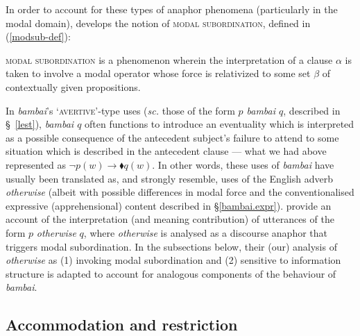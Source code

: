 In order to account for these types of anaphor phenomena (particularly in the modal domain), \citet{Roberts1989,Roberts1990,Roberts2020} develops the notion of \textsc{modal subordination}, defined in (\ref{modsub-def}):

\pex\label{modsub-def}\textsc{modal subordination} is a phenomenon wherein the interpretation of a clause $ \alpha $ is taken to involve a modal operator whose force is relativized to some set $ \beta $ of contextually given propositions.\hfill\citep[718]{Roberts1989}


\xe







In \textit{bambai}'s `\textsc{avertive'}-type uses (\textit{sc.} those of the form \textit{$ p $ bambai $ q $}, described in \S~\ref{lest}), \textit{bambai $ q $} often functions to introduce an eventuality which is interpreted as a possible consequence of the antecedent subject's failure to attend to some situation which is described in the antecedent clause --- what we had above represented as $ \neg p(w)\to\blacklozenge q(w)$. In other words, these uses of \textit{bambai} have usually been translated as, and strongly resemble, uses of the English adverb \textit{otherwise} (albeit with possible differences in modal force and the conventionalised expressive (apprehensional) content described in \S \ref{bambai.expr}). \citet{PhilKotek} provide an account of the interpretation (and meaning contribution) of utterances of the form $ p  $ \textit{otherwise} $ q $, where \textit{otherwise} is analysed as a discourse anaphor that triggers modal subordination. In the subsections below, their (our) analysis of \textit{otherwise} as (1) invoking modal subordination and (2) sensitive to information structure is adapted to account for analogous components of the behaviour of \textit{bambai}.


\subsection{Accommodation and restriction}\label{modsub}

